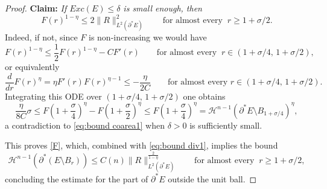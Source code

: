 \documentclass[reqno,11pt]{amsart}
\def\sz{\sigma}
\numberwithin{equation}{section}
\theoremstyle{remark}
\begin{document}
\begin{proof}
\smallskip

\noindent
{\bf Claim:} {\it If $Exc(E)\leq \delta$ is small enough, then
\begin{equation}\label{F}
F(r)^{1-\eta}\le 2\|R\|^2_{L^2(\partial^*E)} \qquad \text{for  almost every } \ r \geq 1+\sigma/2.
\end{equation}}
Indeed, if not, since $F$ is non-increasing we would have
$$F(r)^{1-\eta}\le \frac12 F(r)^{1-\eta} - C F'(r) \qquad \text{for  almost every } \ r\in (1+ {\sz} /4,\,1+\sz/2),$$
or equivalently
$$
\frac{d}{dr}F(r)^\eta= \eta F'(r)F(r)^{\eta-1}\le -\frac{\eta}{2C} \qquad \text{for  almost every } r \in (1+  {\sz}/ 4,\,1+\sz/2).
$$
Integrating this ODE over $(1+ \sz/ 4,\,1+\sz/2)$ one obtains
$$\frac{\eta}{8C}\sz \le  F\left(1+\frac \sz 4\right)^{\eta}- F\left(1+ \frac \sz 2 \right)^{\eta}\le F\left(1+\frac \sz 4\right)^{\eta} = \mathscr H^{n-1}\left(\partial^*E \setminus B_{1+\sigma/4}\right)^{\eta}, $$
a contradiction to \eqref{eq:bound coarea1} when $\delta>0$ is sufficiently small.

This proves \eqref{F}, which, combined with \eqref{eq:bound div1}, implies the bound
$$\mathscr H^{n-1}(\partial^*(E\setminus B_{r}))\le C(n)\|R\|_{L^2(\partial^*E)}^{\frac{2}{1-\eta}} \qquad \text{for  almost every } \ r  \geq 1+\sigma/2,
$$
concluding the estimate for the part of $\partial^*E$
outside the unit ball.


\end{proof}
\end{document}
